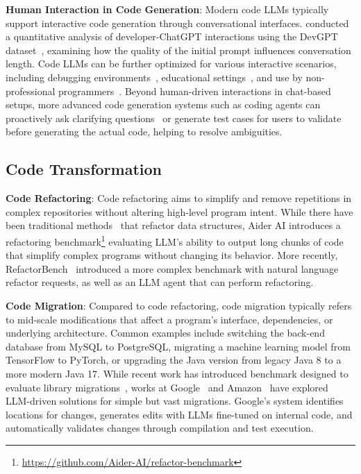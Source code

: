 \textbf{Human Interaction in Code Generation}: 
Modern code LLMs typically support interactive code generation through conversational interfaces. 
\citet{10555598} conducted a quantitative analysis of developer-ChatGPT interactions using the DevGPT dataset~\citep{xiao2024devgpt}, examining how the quality of the initial prompt influences conversation length. 
Code LLMs can be further optimized for various interactive scenarios, including debugging environments~\citep{surameery2023use}, educational settings~\citep{kazemitabaar2023studying, kazemitabaar2023novices, prather2023s, sheese2024patterns}, and use by non-professional programmers~\cite{yan2024intelliexplain}. 
Beyond human-driven interactions in chat-based setups, more advanced code generation systems such as coding agents can proactively ask clarifying questions~\citep{vijayvargiya2025interactiveagentsovercomeambiguity} or generate test cases for users to validate~\citep{lahiri2022interactive, fakhoury2024llm} before generating the actual code, helping to resolve ambiguities.



\subsection{Code Transformation}

\textbf{Code Refactoring}:
Code refactoring aims to simplify and remove repetitions in complex repositories without altering high-level program intent.
While there have been traditional methods~\citep{pailoor2024refactoring} that refactor data structures, Aider AI introduces a refactoring benchmark\footnote{\url{https://github.com/Aider-AI/refactor-benchmark}} evaluating LLM's ability to output long chunks of code that simplify complex programs without changing its behavior.
More recently, RefactorBench~\citep{gautam2024refactorbench} introduced a more complex benchmark with natural language refactor requests, as well as an LLM agent that can perform refactoring.

\textbf{Code Migration}:
Compared to code refactoring, code migration typically refers to mid-scale modifications that affect a program’s interface, dependencies, or underlying architecture. 
Common examples include switching the back-end database from MySQL to PostgreSQL, migrating a machine learning model from TensorFlow to PyTorch, or upgrading the Java version from legacy Java 8 to a more modern Java 17. 
While recent work has introduced benchmark designed to evaluate library migrations~\citep{islam2023pymigbench}, works at Google~\citep{nikolov2025google} and Amazon~\citep{omidvar2024evaluating} have explored LLM-driven solutions for simple but vast migrations.
Google's system identifies locations for changes, generates edits with LLMs fine-tuned on internal code, and automatically validates changes through compilation and test execution.

